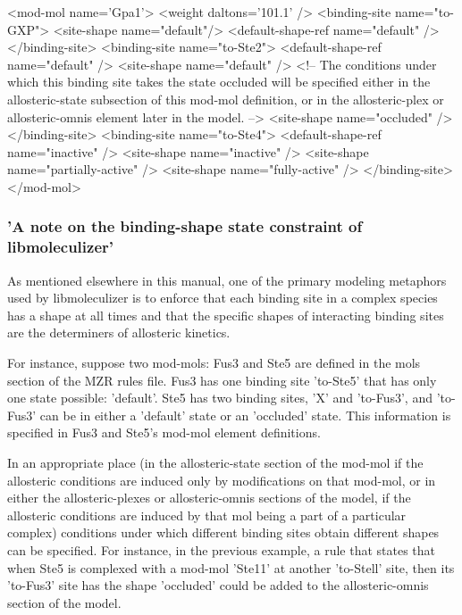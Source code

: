 \begin{ExampleXML}[caption=Defining binding sites in a mod-mol, label=bindingsitedefinitions]
<mod-mol name='Gpa1'>
  <weight daltons='101.1' />
  <binding-site name="to-GXP">
    <site-shape name="default"/>
    <default-shape-ref name="default" />
  </binding-site>
  <binding-site name="to-Ste2">
    <default-shape-ref name="default" />
    <site-shape name="default" />
    <!-- The conditions under which this binding site takes the state
         occluded will be specified either in the allosteric-state
         subsection of this mod-mol definition, or in the
         allosteric-plex or allosteric-omnis element later in the
         model.  -->
    <site-shape name="occluded" />
  </binding-site>
  <binding-site name="to-Ste4">
    <default-shape-ref name="inactive" />
    <site-shape name="inactive" />
    <site-shape name="partially-active" />
    <site-shape name="fully-active" />
  </binding-site>
</mod-mol>
\end{ExampleXML}


\subsubsection{'A note on the binding-shape state constraint of
  libmoleculizer'}
As mentioned elsewhere in this manual, one of the primary modeling
metaphors used by libmoleculizer is to enforce that each binding site
in a complex species has a shape at all times and that the specific
shapes of interacting binding sites are the determiners of allosteric
kinetics.

For instance, suppose two mod-mols: Fus3 and Ste5 are defined in the
mols section of the MZR rules file.  Fus3 has one binding site
'to-Ste5' that has only one state possible: 'default'.  Ste5 has two
binding sites, 'X' and 'to-Fus3', and 'to-Fus3' can be in either a
'default' state or an 'occluded' state.  This information is specified
in Fus3 and Ste5's mod-mol element definitions.

In an appropriate place (in the allosteric-state section of the
mod-mol if the allosteric conditions are induced only by modifications
on that mod-mol, or in either the allosteric-plexes or
allosteric-omnis sections of the model, if the allosteric conditions
are induced by that mol being a part of a particular complex)
conditions under which different binding sites obtain different shapes
can be specified.  For instance, in the previous example, a rule that
states that when Ste5 is complexed with a mod-mol 'Ste11' at another
'to-Stell' site, then its 'to-Fus3' site has the shape 'occluded'
could be added to the allosteric-omnis section of the model.

